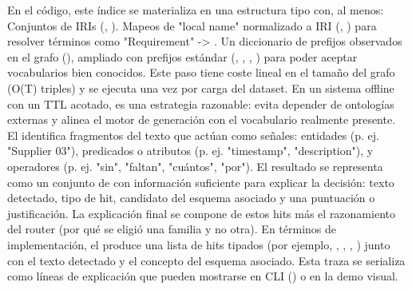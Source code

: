 {}En el código, este índice se materializa en una estructura tipo  con, al menos:\markdownRendererInterblockSeparator
{}\markdownRendererUlBeginTight
\markdownRendererUlItem Conjuntos de IRIs (, ).\markdownRendererUlItemEnd 
\markdownRendererUlItem Mapeos de "local name" normalizado a IRI (, ) para resolver términos como "Requirement" -> .\markdownRendererUlItemEnd 
\markdownRendererUlItem Un diccionario de prefijos observados en el grafo (), ampliado con prefijos estándar (, , , ) para poder aceptar vocabularios bien conocidos.\markdownRendererUlItemEnd 
\markdownRendererUlEndTight \markdownRendererInterblockSeparator
{}Este paso tiene coste lineal en el tamaño del grafo (\markdownRendererBackslash{}\markdownRendererDollarSign{}O(\markdownRendererPipe{}T\markdownRendererPipe{})\markdownRendererBackslash{}\markdownRendererDollarSign{} triples) y se ejecuta una vez por carga del dataset. En un sistema offline con un TTL acotado, es una estrategia razonable: evita depender de ontologías externas y alinea el motor de generación con el vocabulario realmente presente.\markdownRendererInterblockSeparator
{}\markdownRendererInterblockSeparator
{}El  identifica fragmentos del texto que actúan como señales: entidades (p. ej. "Supplier 03"), predicados o atributos (p. ej. "timestamp", "description"), y operadores (p. ej. "sin", "faltan", "cuántos", "por"). El resultado se representa como un conjunto de  con información suficiente para explicar la decisión: texto detectado, tipo de hit, candidato del esquema asociado y una puntuación o justificación.\markdownRendererInterblockSeparator
{}La explicación final se compone de estos hits más el razonamiento del router (por qué se eligió una familia y no otra).\markdownRendererInterblockSeparator
{}En términos de implementación, el  produce una lista de hits tipados (por ejemplo, , , , ) junto con el texto detectado y el concepto del esquema asociado. Esta traza se serializa como líneas de explicación que pueden mostrarse en CLI () o en la demo visual.\markdownRendererInterblockSeparator
